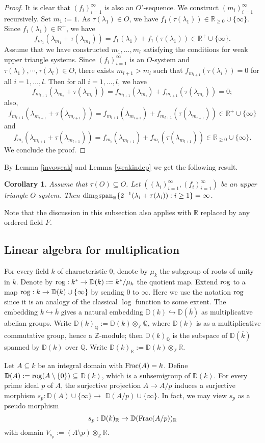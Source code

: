 \documentclass[12pt]{amsart}
\theoremstyle{plain}
\newtheorem{Cor}[Thm]{Corollary}
\theoremstyle{remark}
\theoremstyle{definition}
\def\Z{\mathbb Z}
\def\Q{\mathbb Q}
\def\R{\mathbb R}
\def\D{\mathbb D}
\def\rog{{\rm rog}}
\begin{document}
\begin{proof}
	It is clear that $(f_{i})_{i=1}^\infty$ is also an $O'$-sequence.
	We construct $(m_{i})_{i=1}^\infty$ recursively. Set $m_{1}:=1$. As $\tau(\lambda_{1}) \in O$, we have $f_{1}(\tau(\lambda_{1})) \in \R_{\geq0} \cup\{\infty\}$. Since $f_{1}(\lambda_{1}) \in \R^{+}$, we have$$f_{m_1}(\lambda_{m_{1}}+\tau(\lambda_{m_{1}}))=f_{1}(\lambda_{1})+f_{1}(\tau(\lambda_{1})) \in \R^{+} \cup\{\infty\}.$$
	Assume that we have constructed $m_{1},\dots,m_{l}$ satisfying the conditions for weak upper triangle systems. Since $(f_{i})_{i =1}^\infty$ is an $O$-system and $\tau(\lambda_1),\cdots,\tau(\lambda_l)\in O$, there exists $m_{l+1}>m_{l}$ such that $f_{m_{l+1}}(\tau(\lambda_{i}))=0$ for all $i=1,\dots,l$. Then for all $i=1,\dots,l$, we have$$f_{m_{l+1}}(\lambda_{m_{i}}+\tau(\lambda_{m_{i}}))=f_{m_{l+1}}(\lambda_{m_{i}})+f_{m_{l+1}}(\tau(\lambda_{m_{i}}))=0;$$also,
	$$f_{m_{l+1}}(\lambda_{m_{l+1}}+\tau(\lambda_{m_{l+1}}))=f_{m_{l+1}}(\lambda_{m_{l+1}})+f_{m_{l+1}}(\tau(\lambda_{m_{l+1}})) \in \R^{+} \cup\{\infty\}$$ and $$f_{m_{i}}(\lambda_{m_{l+1}}+\tau(\lambda_{m_{l+1}}))=f_{m_{i}}(\lambda_{m_{l+1}})+f_{m_{i}}(\tau(\lambda_{m_{l+1}})) \in \R_{\geq0} \cup\{\infty\}.$$We conclude the proof.
\end{proof}
By Lemma \ref{invoweak} and Lemma \ref{weakindep} we get the following result.
\begin{Cor}\label{invoindep}
	Assume that $\tau(O)\subseteq O$. Let $((\lambda_{i})_{i=1}^\infty,(f_{i})_{i=1}^\infty)$ be an upper triangle $O$-system. Then ${\rm dim}_{\R}{\rm span}_{\R}\{ 2^{-1}(\lambda_{i}+\tau(\lambda_{i})):i\geq 1\}=\infty$.
\end{Cor}
Note that the discussion in this subsection also applies with $\R$ replaced by any ordered field $F$. 
\subsection{Linear algebra for multiplication}For every field $k$ of characteristic $0$, denote by $\mu_{k}$ the subgroup of roots of unity in $k$. Denote by $\rog : k^{*} \to \D(k):=k^{*}/\mu_{k}$ the quotient map. Extend $\rog$ to a map $\rog : k \to \D(k) \cup\{\infty\}$ by sending $0$ to $\infty$. Here we use the notation $\rog$ since it is an analogy of the classical $\log$ function to some extent. The embedding $k \hookrightarrow \overline{k}$ gives a natural embedding $\D(k) \hookrightarrow \D(\overline{k})$ as multiplicative abelian groups. Write $\D(k)_{\Q}:=\D(k) \otimes_{\Z} \Q$, where $\D(k)$ is as a multiplicative commutative group, hence a $\Z$-module; then $\D(k)_{\Q}$ is the subspace of $\D(\overline{k})$ spanned by $\D(k)$ over $\Q$. Write $\D(k)_{\R}:=\D(k) \otimes_{\Z} \R$.\par
Let $A\subseteq k$ be an integral domain with ${\rm Frac}(A)=k$. Define $\D(A):=\rog (A\setminus\{0\}) \subseteq$ $\D(k)$, which is a subsemigroup of $\D(k)$. For every prime ideal $p$ of $A$, the surjective projection $A \to A/p$ induces a surjective morphism $s_{p}: \D(A) \cup\{\infty\} \to$ $\D(A / p) \cup\{\infty\}$. In fact, we may view $s_{p}$ as a pseudo morphism
$$
s_{p}: \D(k)_{\R} \to \D({\rm Frac}(A / p))_{\R}
$$with domain $V_{s_{p}}:=(A \setminus p) \otimes_{\Z} \R$.
\end{document}
